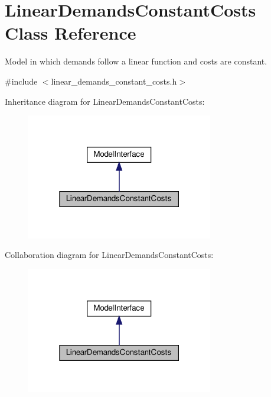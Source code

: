 \hypertarget{classLinearDemandsConstantCosts}{}\section{Linear\+Demands\+Constant\+Costs Class Reference}
\label{classLinearDemandsConstantCosts}


Model in which demands follow a linear function and costs are constant.  




{\ttfamily \#include $<$linear\+\_\+demands\+\_\+constant\+\_\+costs.\+h$>$}



Inheritance diagram for Linear\+Demands\+Constant\+Costs\+:
\nopagebreak
\begin{figure}[H]
\begin{center}
\leavevmode
\includegraphics[width=231pt]{classLinearDemandsConstantCosts__inherit__graph}
\end{center}
\end{figure}


Collaboration diagram for Linear\+Demands\+Constant\+Costs\+:
\nopagebreak
\begin{figure}[H]
\begin{center}
\leavevmode
\includegraphics[width=231pt]{classLinearDemandsConstantCosts__coll__graph}
\end{center}
\end{figure}
